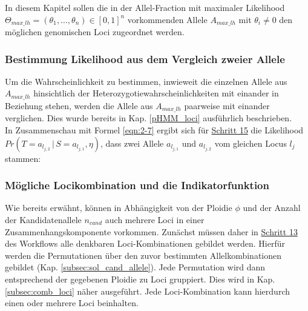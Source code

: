 In diesem Kapitel sollen die in der Allel-Fraction mit maximaler Likelihood $\Theta_{max\_lh} = (\theta_{1},\dots,\theta_{n}) \in [0,1]^n $ vorkommenden Allele $A_{max\_lh}$ mit $\theta_{i} \neq 0$ den möglichen genomischen Loci zugeordnet werden. \\

\subsubsection{Bestimmung Likelihood aus dem Vergleich zweier Allele} \label{sol_lh_al_al}

Um die Wahrscheinlichkeit zu bestimmen, inwieweit die einzelnen Allele aus $A_{max\_lh}$ hinsichtlich der Heterozygotiewahrscheinlichkeiten mit einander in Beziehung stehen, werden die Allele aus $A_{max\_lh}$ paarweise mit einander verglichen. Dies wurde bereits in Kap. \ref{pHMM_loci} ausführlich beschrieben. \\

In Zusammenschau mit Formel \eqref{eqn:2-7} ergibt sich für \hyperref[step15]{Schritt 15} die Likelihood $ Pr(T=a_{l_{j,2}} \, | \, S=a_{l_{j,1}}, \eta) $, dass zwei Allele $a_{l_{j,1}}$ und $a_{l_{j,2}}$ vom gleichen Locus $l_{j}$ stammen:
\vspace{-0.5cm}
\begin{center}
\end{center}

\subsubsection{Mögliche Locikombination und die Indikatorfunktion}

Wie bereits erwähnt, können in Abhängigkeit von der Ploidie $ \phi $ und der Anzahl der Kandidatenallele $n_{cand}$ auch mehrere Loci in einer Zusammenhangskomponente vorkommen. Zunächst müssen daher in \hyperref[step13]{Schritt 13\label{step13txt}} des Workflows alle denkbaren Loci-Kombinationen gebildet werden. Hierfür werden die Permutationen über den zuvor bestimmten Allelkombinationen gebildet (Kap. \ref{subsec:sol_cand_allele}). Jede Permutation wird dann entsprechend der gegebenen Ploidie zu Loci gruppiert. Dies wird in Kap. \ref{subsec:comb_loci} näher ausgeführt. Jede Loci-Kombination kann hierdurch einen oder mehrere Loci beinhalten.\\

